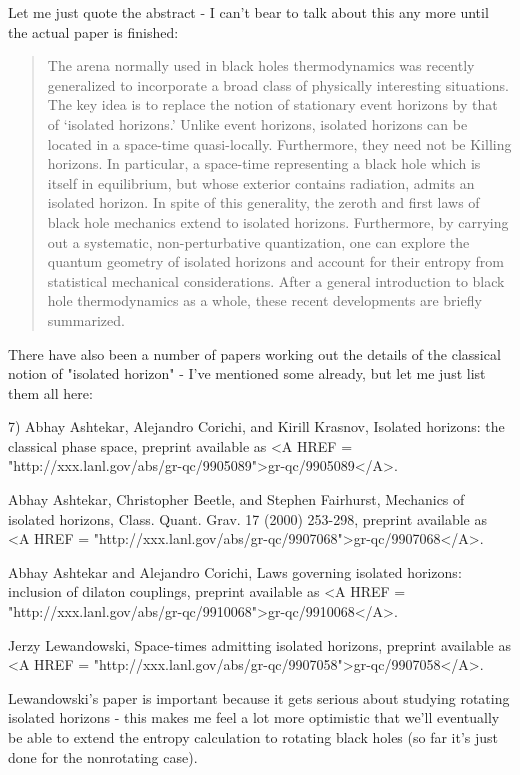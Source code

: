 Let me just quote the abstract - I can't bear to talk about this any
more until the actual paper is finished:

\begin{quote}
     The arena normally used in black holes thermodynamics was recently
     generalized to incorporate a broad class of physically interesting
     situations.  The key idea is to replace the notion of stationary
     event horizons by that of `isolated horizons.'  Unlike event
     horizons, isolated horizons can be located in a space-time
     quasi-locally. Furthermore, they need not be Killing horizons. In
     particular, a space-time representing a black hole which is itself
     in equilibrium, but whose exterior contains radiation, admits an
     isolated horizon.  In spite of this generality, the zeroth and
     first laws of black hole mechanics extend to isolated horizons.
     Furthermore, by carrying out a systematic, non-perturbative
     quantization, one can explore the quantum geometry of isolated
     horizons and account for their entropy from statistical mechanical
     considerations.  After a general introduction to black hole
     thermodynamics as a whole, these recent developments are briefly
     summarized.
\end{quote}
There have also been a number of papers working out the details
of the classical notion of "isolated horizon" - I've mentioned some 
already, but let me just list them all here:

7) Abhay Ashtekar, Alejandro Corichi, and Kirill Krasnov, 
Isolated horizons: the classical phase space, preprint available
as <A HREF = "http://xxx.lanl.gov/abs/gr-qc/9905089">gr-qc/9905089</A>.  

Abhay Ashtekar, Christopher Beetle, and Stephen Fairhurst, 
Mechanics of isolated horizons, Class. Quant. Grav. 17 (2000) 253-298,
preprint available as <A HREF = "http://xxx.lanl.gov/abs/gr-qc/9907068">gr-qc/9907068</A>.

Abhay Ashtekar and Alejandro Corichi, Laws governing isolated horizons:
inclusion of dilaton couplings, preprint available as <A HREF = "http://xxx.lanl.gov/abs/gr-qc/9910068">gr-qc/9910068</A>.

Jerzy Lewandowski, Space-times admitting isolated horizons, preprint
available as <A HREF = "http://xxx.lanl.gov/abs/gr-qc/9907058">gr-qc/9907058</A>. 

Lewandowski's paper is important because it gets serious about studying
rotating isolated horizons - this makes me feel a lot more optimistic
that we'll eventually be able to extend the entropy calculation to 
rotating black holes (so far it's just done for the nonrotating case).

